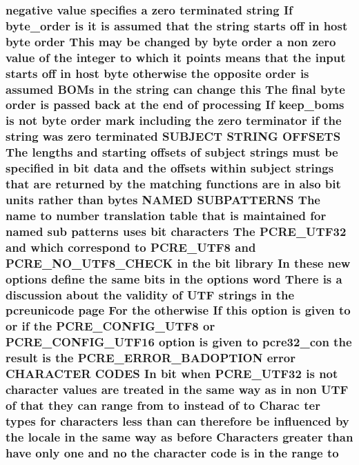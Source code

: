 \subsubsection[{\texorpdfstring{to}{to}}]{ negative {\bf value} specifies {\bf a} {\bf zero} terminated {\bf string} If byte\+\_\+order {\bf is} {\bf it} {\bf is} assumed that the {\bf string} starts off {\bf in} {\bf host} byte {\bf order} This may {\bf be} changed by byte {\bf order} {\bf a} non {\bf zero} {\bf value} {\bf of} the integer to {\bf which} {\bf it} points means that the {\bf input} starts off {\bf in} {\bf host} byte otherwise the opposite {\bf order} {\bf is} assumed B\+O\+Ms {\bf in} the {\bf string} {\bf can} change {\bf this} The final byte {\bf order} {\bf is} passed back at the {\bf end} {\bf of} processing If keep\+\_\+boms {\bf is} {\bf not} byte {\bf order} {\bf mark} including the {\bf zero} terminator {\bf if} the {\bf string} was {\bf zero} terminated S\+U\+B\+J\+E\+CT {\bf S\+T\+R\+I\+NG} O\+F\+F\+S\+E\+TS The lengths and starting {\bf offsets} {\bf of} subject {\bf strings} must {\bf be} {\bf specified} {\bf in} {\bf bit} {\bf data} and the {\bf offsets} within subject {\bf strings} that {\bf are} returned by the {\bf matching} {\bf functions} {\bf are} {\bf in} also {\bf bit} {\bf units} rather {\bf than} {\bf bytes} N\+A\+M\+ED S\+U\+B\+P\+A\+T\+T\+E\+R\+NS The {\bf name} to {\bf number} translation {\bf table} that {\bf is} maintained for named sub {\bf patterns} uses {\bf bit} {\bf characters} The {\bf P\+C\+R\+E\+\_\+\+U\+T\+F32} and {\bf which} correspond to {\bf P\+C\+R\+E\+\_\+\+U\+T\+F8} and {\bf P\+C\+R\+E\+\_\+\+N\+O\+\_\+\+U\+T\+F8\+\_\+\+C\+H\+E\+CK} {\bf in} the {\bf bit} {\bf library} In these new {\bf options} define the same bits {\bf in} the {\bf options} {\bf word} There {\bf is} {\bf a} discussion about the validity {\bf of} U\+TF {\bf strings} {\bf in} the pcreunicode page For the otherwise If {\bf this} {\bf option} {\bf is} {\bf given} to {\bf or} {\bf if} the {\bf P\+C\+R\+E\+\_\+\+C\+O\+N\+F\+I\+G\+\_\+\+U\+T\+F8} {\bf or} {\bf P\+C\+R\+E\+\_\+\+C\+O\+N\+F\+I\+G\+\_\+\+U\+T\+F16} {\bf option} {\bf is} {\bf given} to pcre32\+\_\+con the {\bf result} {\bf is} the {\bf P\+C\+R\+E\+\_\+\+E\+R\+R\+O\+R\+\_\+\+B\+A\+D\+O\+P\+T\+I\+ON} {\bf error} C\+H\+A\+R\+A\+C\+T\+ER C\+O\+D\+ES In {\bf bit} when {\bf P\+C\+R\+E\+\_\+\+U\+T\+F32} {\bf is} {\bf not} {\bf character} {\bf values} {\bf are} treated {\bf in} the same {\bf way} {\bf as} {\bf in} non U\+TF {\bf of} that they {\bf can} range {\bf from} to instead {\bf of} to Charac ter {\bf types} for {\bf characters} less {\bf than} {\bf can} {\bf therefore} {\bf be} influenced by the {\bf locale} {\bf in} the same {\bf way} {\bf as} before Characters greater {\bf than} have only one and no the {\bf character} {\bf code} {\bf is} {\bf in} the range to}\hypertarget{group__MOD__PROXY_ga4d80b46c1e04eba6561893714933df30}{}\label{group__MOD__PROXY_ga4d80b46c1e04eba6561893714933df30}
